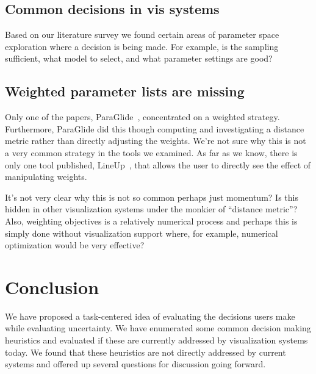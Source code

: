 

\subsection{Common decisions in vis systems}
\label{common-decisions-in-vis-systems}

Based on our literature survey we found certain areas of parameter space
exploration where a decision is being made.  For example, is the sampling
sufficient, what model to select, and what parameter settings are good?


\subsection{Weighted parameter lists are
missing}\label{weighted-parameter-lists-are-missing}

Only one of the papers, ParaGlide~\citep{Bergner:2013}, concentrated on a
weighted strategy. Furthermore, ParaGlide did this though computing and
investigating a distance metric rather than directly adjusting the
weights. We're not sure why this is not a very common strategy in the
tools we examined. As far as we know, there is only one tool published,
LineUp~\citep{Gratzl:2013}, that allows the user to directly see the
effect of manipulating weights.


It's not very clear why this is not so common perhaps just momentum? Is
this hidden in other visualization systems under the monkier of
``distance metric''? Also, weighting objectives is a relatively
numerical process and perhaps this is simply done without visualization
support where, for example, numerical optimization would be very
effective?


\section{Conclusion}

We have proposed a task-centered idea of evaluating the decisions users
make while evaluating uncertainty.  We have enumerated some common decision
making heuristics and evaluated if these are currently addressed by 
visualization systems today. We found that these heuristics are not directly
addressed by current systems and offered up several questions for
discussion going forward.

